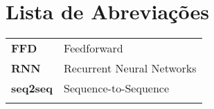 \chapter{Lista de Abreviações}
\begin{tabular}{ll}
\vspace{3mm}
\textbf{FFD} 		 & Feedforward\\ \vspace{3mm}
\textbf{RNN} 		 & Recurrent Neural Networks\\ \vspace{3mm}
\textbf{seq2seq} 	 & Sequence-to-Sequence\\ \vspace{3mm}

\end{tabular}
